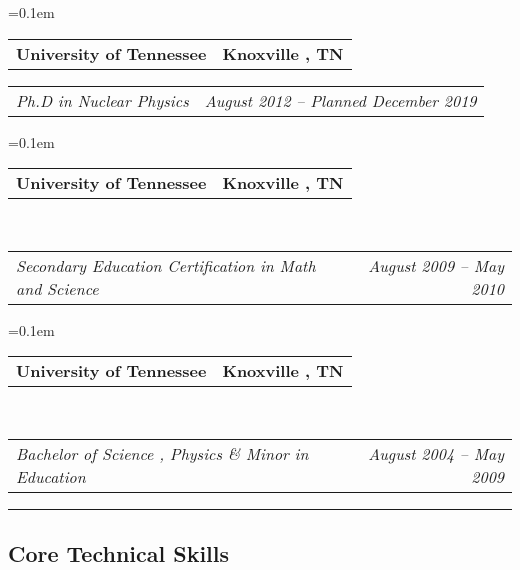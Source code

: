 \documentclass[12pt,letterpaper]{article}
\makeatletter
\newcommand{\headerrow}[2]
{\begin{tabular*}{\linewidth}{l@{\extracolsep{\fill}}r}
	#1 &
	#2 \\
\end{tabular*}}
\makeatother
\begin{document}
\begin{itemize*}
	\parskip=0.1em

	\item 
	\headerrow
		{\textbf{University of Tennessee}}
		{\textbf{Knoxville , TN}}
	
	\headerrow
		{\emph{Ph.D in Nuclear Physics}}
		{\emph{August 2012 -- Planned December 2019}}


	\parskip=0.1em
	
	\item 
	\headerrow
	{\textbf{University of Tennessee}}
	{\textbf{Knoxville , TN}}
	\\
	\headerrow
	{\emph{Secondary Education Certification in Math and Science}}
	{\emph{August 2009 -- May 2010}}
	

	\parskip=0.1em
	
	\item 
	\headerrow
	{\textbf{University of Tennessee}}
	{\textbf{Knoxville , TN}}
	\\
	\headerrow
	{\emph{Bachelor of Science , Physics \& Minor in Education }}
	{\emph{August 2004 -- May 2009}}

	
\end{itemize*}


\hrule
\vspace{-0.4em}
\subsection*{Core Technical Skills}
\end{document}
